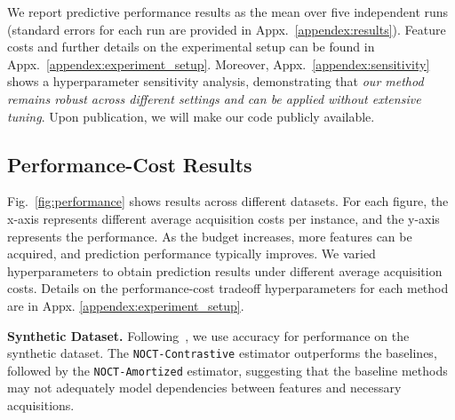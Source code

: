 
We report predictive performance results as the mean over five independent runs (standard errors for each run are provided in Appx.~\ref{appendex:results}). Feature costs and further details on the experimental setup can be found in Appx.~\ref{appendex:experiment_setup}. Moreover, Appx.~\ref{appendex:sensitivity} shows a hyperparameter sensitivity analysis, demonstrating that 
\textit{our method remains robust across different settings and can be applied without extensive tuning}.
Upon publication, we will make our code publicly available.


\subsection{Performance-Cost Results}


Fig.~\ref{fig:performance} shows results across different datasets. For each figure, the x-axis represents different average acquisition costs per instance, and the y-axis represents the performance. As the budget increases, more features can be acquired, and prediction performance typically improves. 
We varied hyperparameters to obtain prediction results under different average acquisition costs. Details on the performance-cost tradeoff hyperparameters for each method are in Appx. \ref{appendex:experiment_setup}.

\textbf{Synthetic Dataset.} Following~\citet{kossen2022active}, we use accuracy for performance on the synthetic dataset. The \texttt{NOCT-Contrastive} estimator outperforms the baselines, followed by the  \texttt{NOCT-Amortized} estimator, suggesting that the baseline methods may not adequately model dependencies between features and necessary acquisitions. 


